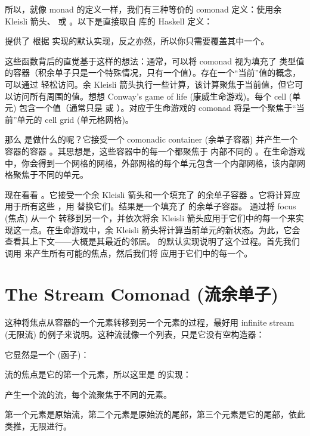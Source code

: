 所以，就像 monad 的定义一样，我们有三种等价的 comonad 定义：使用余 Kleisli 箭头、 或 。以下是直接取自  库的 Haskell 定义：

提供了  根据  实现的默认实现，反之亦然，所以你只需要覆盖其中一个。

这些函数背后的直觉基于这样的想法：通常，可以将 comonad 视为填充了  类型值的容器（积余单子只是一个特殊情况，只有一个值）。存在一个“当前”值的概念，可以通过  轻松访问。余 Kleisli 箭头执行一些计算，该计算聚焦于当前值，但它可以访问所有周围的值。想想 Conway's game of life (康威生命游戏)。每个 cell (单元) 包含一个值（通常只是  或 ）。对应于生命游戏的 comonad 将是一个聚焦于“当前”单元的 cell grid (单元格网格)。

那么  是做什么的呢？它接受一个 comonadic container (余单子容器)  并产生一个容器的容器 。其思想是，这些容器中的每一个都聚焦于  内部不同的 。在生命游戏中，你会得到一个网格的网格，外部网格的每个单元包含一个内部网格，该内部网格聚焦于不同的单元。

现在看看 。它接受一个余 Kleisli 箭头和一个填充了  的余单子容器 。它将计算应用于所有这些 ，用  替换它们。结果是一个填充了  的余单子容器。 通过将 focus (焦点) 从一个  转移到另一个，并依次将余 Kleisli 箭头应用于它们中的每一个来实现这一点。在生命游戏中，余 Kleisli 箭头将计算当前单元的新状态。为此，它会查看其上下文——大概是其最近的邻居。  的默认实现说明了这个过程。首先我们调用  来产生所有可能的焦点，然后我们将  应用于它们中的每一个。

\section{The Stream Comonad (流余单子)}

这种将焦点从容器的一个元素转移到另一个元素的过程，最好用 infinite stream (无限流) 的例子来说明。这种流就像一个列表，只是它没有空构造器：

它显然是一个  (函子)：

流的焦点是它的第一个元素，所以这里是  的实现：

 产生一个流的流，每个流聚焦于不同的元素。

第一个元素是原始流，第二个元素是原始流的尾部，第三个元素是它的尾部，依此类推，无限进行。

